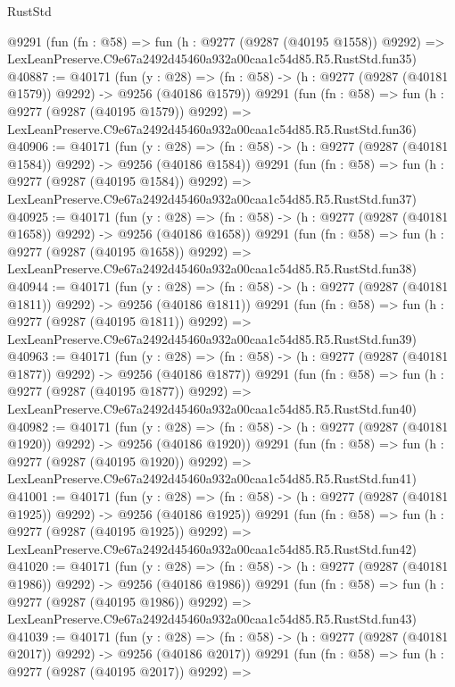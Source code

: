 \begin{lexlean}{RustStd}
\begin{coremodule}
    @9291
    (fun (fn : @58) =>
    fun (h : @9277 (@9287 (@40195 @1558)) @9292) =>
    LexLeanPreserve.C9e67a2492d45460a932a00caa1c54d85.R5.RustStd.fun35)
@40887 := @40171
    (fun (y : @28) =>
    (fn : @58) -> (h : @9277 (@9287 (@40181 @1579)) @9292) -> @9256 (@40186 @1579))
    @9291
    (fun (fn : @58) =>
    fun (h : @9277 (@9287 (@40195 @1579)) @9292) =>
    LexLeanPreserve.C9e67a2492d45460a932a00caa1c54d85.R5.RustStd.fun36)
@40906 := @40171
    (fun (y : @28) =>
    (fn : @58) -> (h : @9277 (@9287 (@40181 @1584)) @9292) -> @9256 (@40186 @1584))
    @9291
    (fun (fn : @58) =>
    fun (h : @9277 (@9287 (@40195 @1584)) @9292) =>
    LexLeanPreserve.C9e67a2492d45460a932a00caa1c54d85.R5.RustStd.fun37)
@40925 := @40171
    (fun (y : @28) =>
    (fn : @58) -> (h : @9277 (@9287 (@40181 @1658)) @9292) -> @9256 (@40186 @1658))
    @9291
    (fun (fn : @58) =>
    fun (h : @9277 (@9287 (@40195 @1658)) @9292) =>
    LexLeanPreserve.C9e67a2492d45460a932a00caa1c54d85.R5.RustStd.fun38)
@40944 := @40171
    (fun (y : @28) =>
    (fn : @58) -> (h : @9277 (@9287 (@40181 @1811)) @9292) -> @9256 (@40186 @1811))
    @9291
    (fun (fn : @58) =>
    fun (h : @9277 (@9287 (@40195 @1811)) @9292) =>
    LexLeanPreserve.C9e67a2492d45460a932a00caa1c54d85.R5.RustStd.fun39)
@40963 := @40171
    (fun (y : @28) =>
    (fn : @58) -> (h : @9277 (@9287 (@40181 @1877)) @9292) -> @9256 (@40186 @1877))
    @9291
    (fun (fn : @58) =>
    fun (h : @9277 (@9287 (@40195 @1877)) @9292) =>
    LexLeanPreserve.C9e67a2492d45460a932a00caa1c54d85.R5.RustStd.fun40)
@40982 := @40171
    (fun (y : @28) =>
    (fn : @58) -> (h : @9277 (@9287 (@40181 @1920)) @9292) -> @9256 (@40186 @1920))
    @9291
    (fun (fn : @58) =>
    fun (h : @9277 (@9287 (@40195 @1920)) @9292) =>
    LexLeanPreserve.C9e67a2492d45460a932a00caa1c54d85.R5.RustStd.fun41)
@41001 := @40171
    (fun (y : @28) =>
    (fn : @58) -> (h : @9277 (@9287 (@40181 @1925)) @9292) -> @9256 (@40186 @1925))
    @9291
    (fun (fn : @58) =>
    fun (h : @9277 (@9287 (@40195 @1925)) @9292) =>
    LexLeanPreserve.C9e67a2492d45460a932a00caa1c54d85.R5.RustStd.fun42)
@41020 := @40171
    (fun (y : @28) =>
    (fn : @58) -> (h : @9277 (@9287 (@40181 @1986)) @9292) -> @9256 (@40186 @1986))
    @9291
    (fun (fn : @58) =>
    fun (h : @9277 (@9287 (@40195 @1986)) @9292) =>
    LexLeanPreserve.C9e67a2492d45460a932a00caa1c54d85.R5.RustStd.fun43)
@41039 := @40171
    (fun (y : @28) =>
    (fn : @58) -> (h : @9277 (@9287 (@40181 @2017)) @9292) -> @9256 (@40186 @2017))
    @9291
    (fun (fn : @58) =>
    fun (h : @9277 (@9287 (@40195 @2017)) @9292) =>

\end{coremodule}
\end{lexlean}
